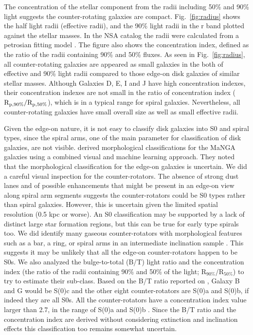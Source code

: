 \documentclass[fleqn,usenatbib]{mnras}
\begin{document}
The concentration of the stellar component from 
the radii including 50\% and 90\% light suggests the counter-rotating galaxies are compact.
Fig.~\ref{fig:radius} shows the half light radii (effective radii), 
and the 90\% light radii in the r band plotted against the stellar masses.
In the NSA catalog the radii were calculated 
from a petrosian fitting model \citep{NSA}. 
The figure also shows the concentration index, defined as
the ratio of the radii containing 90\% and 50\% fluxes. 
As seen in Fig.~\ref{fig:radius}, all counter-rotating galaxies 
are appeared as small galaxies in the both of effective and 90\% light radii
compared to those edge-on disk galaxies of similar stellar masses.
Although Galaxies D, E, I and J have high concentration indexes,
their concentration indexes are not small in the ratio of concentration index ($\rm R_{p,90\%}/R_{p,50\%}$), 
which is in a typical range for spiral galaxies.
Nevertheless, all counter-rotating galaxies
have small overall size as well as small effective radii. 



Given the edge-on nature, 
it is not easy to classify disk galaxies into S0 and spiral types,
since the spiral arms, one of the main parameter for classification of disk galaxies, are not visible.
\citet{Dominguez_Sanchez2022} derived morphological classifications
for the MaNGA galaxies using a combined visual and machine learning approach. They noted that
the morphological classification for the edge-on galaxies
is uncertain.
We did a careful visual inspection for the counter-rotators. 
The absence of strong dust lanes and of possible enhancements that might be present in an edge-on view along spiral arm segments suggests the counter-rotators could be S0 types rather than spiral galaxies. However, this is uncertain given the limited spatial resolution (0.5 kpc or worse).
An S0 classification may be supported by a lack of distinct large star formation regions, but this can be true for early type spirals too.
We did identify many gaseous counter-rotators 
with morphological features such as a bar, a ring, or spiral arms 
in an intermediate inclination sample \citep{Beom2022}. This suggests it may be unlikely that all the edge-on counter-rotators happen to be S0s.
We also analyzed the bulge-to-total (B/T) light ratio and the concentration index (the ratio of the radii containing 90\% and 50\% of the light; R$_{90\%}$/R$_{50\%}$)
to try to estimate their sub-class. 
Based on the B/T ratio reported on \citet{GrahamWorley2008, KormendyBender2012},
Galaxy B and G would be S(0)c and 
the other eight counter-rotators are S(0)a and S(0)b, if indeed they are all S0s. All the counter-rotators have
a concentration index value larger than 2.7,  
in the range of S(0)a and S(0)b \citep{Kautsch2006}.
Since the B/T ratio and the concentration index are derived 
without considering extinction and inclination effects 
this classification too remains somewhat uncertain.
\end{document}
